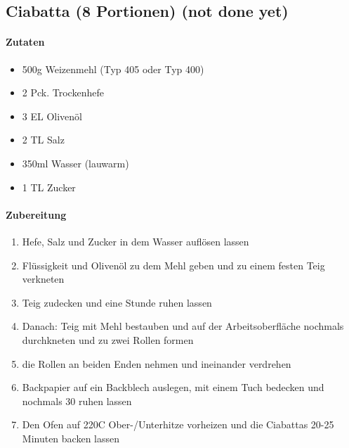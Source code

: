 \newpage
\subsection{Ciabatta (8 Portionen) (not done yet)}
\paragraph{Zutaten}
\begin{itemize}[noitemsep]
	\item 500g Weizenmehl (Typ 405 oder Typ 400)
	\item 2 Pck. Trockenhefe
	\item 3 EL Olivenöl
	\item 2 TL Salz
	\item 350ml Wasser (lauwarm)
	\item 1 TL Zucker
\end{itemize}
\paragraph{Zubereitung}
\begin{enumerate}[noitemsep]
	\item Hefe, Salz und Zucker in dem Wasser auflösen lassen
	\item Flüssigkeit und Olivenöl zu dem Mehl geben und zu einem festen Teig verkneten
	\item Teig zudecken und eine Stunde ruhen lassen
	\item Danach: Teig mit Mehl bestauben und auf der Arbeitsoberfläche nochmals durchkneten und zu zwei Rollen formen
	\item die Rollen an beiden Enden nehmen und ineinander verdrehen
	\item Backpapier auf ein Backblech auslegen, mit einem Tuch bedecken und nochmals 30 ruhen lassen
	\item Den Ofen auf 220\textdegree C Ober-/Unterhitze vorheizen und die Ciabattas 20-25 Minuten backen lassen
\end{enumerate}